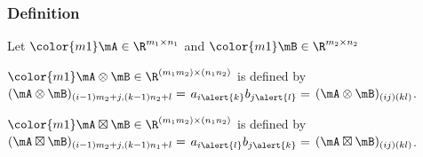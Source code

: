 \begin{frame}
\frametitle{Definition}
Let $\color{m1}\mA\in\R^{m_1\times n_1}$ and
$\color{m1}\mB\in\R^{m_2\times n_2}$

\begin{definition}
$\color{m1}\mA\otimes\mB\in\R^{(m_1m_2)\times(n_1n_2)}$
is defined by
{\color{m1}$(\mA\otimes\mB)_{(i-1)m_2+j,(k-1)n_2+l}=$ $a_{i\alert{k}}b_{j\alert{l}}=$ $(\mA\otimes\mB)_{(ij)(kl)}$}.
\end{definition}

\begin{definition}
$\color{m1}\mA\boxtimes\mB\in\R^{(m_1m_2)\times(n_1n_2)}$
is defined by
{\color{m1}
$(\mA\boxtimes\mB)_{(i-1)m_2+j,(k-1)n_1+l}=$ $a_{i\alert{l}}b_{j\alert{k}}=$ $(\mA\boxtimes\mB)_{(ij)(kl)}$.}
\end{definition}
\end{frame}

